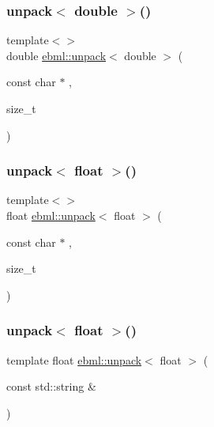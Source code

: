 \mbox{\label{namespaceebml_a8fc03073fb4d10e4aef90a2985201603}} 
\subsubsection{\texorpdfstring{unpack$<$ double $>$()}{unpack< double >()}\hspace{0.1cm}{\footnotesize\ttfamily [2/2]}}
{\footnotesize\ttfamily template$<$$>$ \\
double \mbox{\hyperlink{namespaceebml_a55a0f9d0c93e80d488021fd03c4f3861}{ebml\+::unpack}}$<$ double $>$ (\begin{DoxyParamCaption}\item[{const char $\ast$}]{,  }\item[{size\+\_\+t}]{ }\end{DoxyParamCaption})}

\mbox{\label{namespaceebml_a9055e0d919f5e12fd661512096c811d1}} 
\subsubsection{\texorpdfstring{unpack$<$ float $>$()}{unpack< float >()}\hspace{0.1cm}{\footnotesize\ttfamily [1/2]}}
{\footnotesize\ttfamily template$<$$>$ \\
float \mbox{\hyperlink{namespaceebml_a55a0f9d0c93e80d488021fd03c4f3861}{ebml\+::unpack}}$<$ float $>$ (\begin{DoxyParamCaption}\item[{const char $\ast$}]{,  }\item[{size\+\_\+t}]{ }\end{DoxyParamCaption})}

\mbox{\label{namespaceebml_a34096c5ab0e26fba384ea9d910a5a393}} 
\subsubsection{\texorpdfstring{unpack$<$ float $>$()}{unpack< float >()}\hspace{0.1cm}{\footnotesize\ttfamily [2/2]}}
{\footnotesize\ttfamily template float \mbox{\hyperlink{namespaceebml_a55a0f9d0c93e80d488021fd03c4f3861}{ebml\+::unpack}}$<$ float $>$ (\begin{DoxyParamCaption}\item[{const std\+::string \&}]{ }\end{DoxyParamCaption})}

